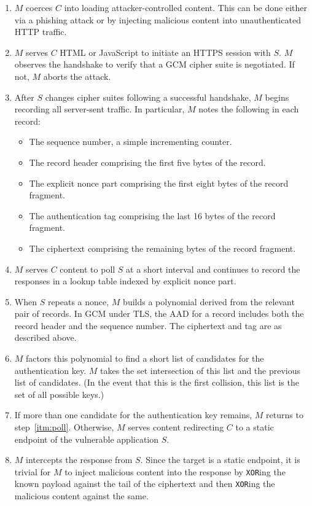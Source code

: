 \documentclass[10pt, a4paper]{article}
\begin{document}
\begin{enumerate}

\item $M$ coerces $C$ into loading attacker-controlled content. This can be done either via a phishing attack or by injecting malicious content into unauthenticated HTTP traffic.

\item $M$ serves $C$ HTML or JavaScript to initiate an HTTPS session with $S$. $M$ observes the handshake to verify that a GCM cipher suite is negotiated. If not, $M$ aborts the attack.

\item After $S$ changes cipher suites following a successful handshake, $M$ begins recording all server-sent traffic. In particular, $M$ notes the following in each record:

  \begin{itemize}
  \item The sequence number, a simple incrementing counter.
  \item The record header comprising the first five bytes of the record.
  \item The explicit nonce part comprising the first eight bytes of the record fragment.
  \item The authentication tag comprising the last 16 bytes of the record fragment.
  \item The ciphertext comprising the remaining bytes of the record fragment.
  \end{itemize}

\item $M$ serves $C$ content to poll $S$ at a short interval and continues to record the responses in a lookup table indexed by explicit nonce part.\label{itm:poll}

\item When $S$ repeats a nonce, $M$ builds a polynomial derived from the relevant pair of records. In GCM under TLS, the AAD for a record includes both the record header and the sequence number. The ciphertext and tag are as described above.

\item $M$ factors this polynomial to find a short list of candidates for the authentication key. $M$ takes the set intersection of this list and the previous list of candidates. (In the event that this is the first collision, this list is the set of all possible keys.)

\item If more than one candidate for the authentication key remains, $M$ returns to step~\ref{itm:poll}. Otherwise, $M$ serves content redirecting $C$ to a static endpoint of the vulnerable application $S$.

\item $M$ intercepts the response from $S$. Since the target is a static endpoint, it is trivial for $M$ to inject malicious content into the response by \texttt{XOR}ing the known payload against the tail of the ciphertext and then \texttt{XOR}ing the malicious content against the same.

\end{enumerate}
\end{document}
